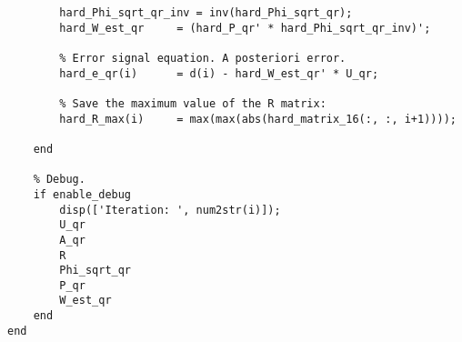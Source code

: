 \begin{lstlisting}[style=C]
        % Filter coefficients. 
        hard_Phi_sqrt_qr_inv = inv(hard_Phi_sqrt_qr);
        hard_W_est_qr     = (hard_P_qr' * hard_Phi_sqrt_qr_inv)';
    
        % Error signal equation. A posteriori error.
        hard_e_qr(i)      = d(i) - hard_W_est_qr' * U_qr;
    
        % Save the maximum value of the R matrix:
        hard_R_max(i)     = max(max(abs(hard_matrix_16(:, :, i+1))));

    end

    % Debug.
    if enable_debug
        disp(['Iteration: ', num2str(i)]);
        U_qr
        A_qr
        R
        Phi_sqrt_qr
        P_qr
        W_est_qr
    end
end
\end{lstlisting}
